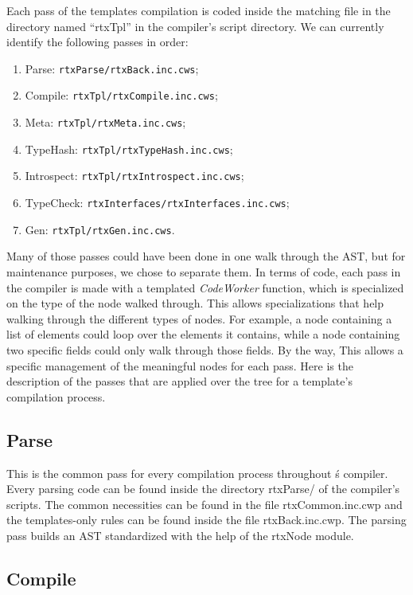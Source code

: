 \documentclass[american]{rtxreport}
\begin{document}
Each pass of the templates compilation is coded inside the matching file in the
directory named ``rtxTpl'' in the compiler's script directory. We can currently
identify the following passes in order:
\begin{enumerate}
    \item Parse: \texttt{rtxParse/rtxBack.inc.cws};
    \item Compile: \texttt{rtxTpl/rtxCompile.inc.cws};
    \item Meta: \texttt{rtxTpl/rtxMeta.inc.cws};
    \item TypeHash: \texttt{rtxTpl/rtxTypeHash.inc.cws};
    \item Introspect: \texttt{rtxTpl/rtxIntrospect.inc.cws};
    \item TypeCheck: \texttt{rtxInterfaces/rtxInterfaces.inc.cws};
    \item Gen: \texttt{rtxTpl/rtxGen.inc.cws}.
\end{enumerate}

Many of those passes could have been done in one walk through the AST, but for
maintenance purposes, we chose to separate them. In terms of code, each pass in
the compiler is made with a templated \emph{CodeWorker} function, which is
specialized on the type of the node walked through. This allows specializations
that help walking through the different types of nodes. For example, a node
containing a list of elements could loop over the elements it contains, while a
node containing two specific fields could only walk through those fields. By
the way, This allows a specific management of the meaningful nodes for each
pass. Here is the description of the passes that are applied over the tree for
a template's compilation process.

\subsection{Parse}

This is the common pass for every compilation process throughout \rtx\'s
compiler. Every parsing code can be found inside the directory rtxParse/ of the
compiler's scripts. The common necessities can be found in the file
rtxCommon.inc.cwp and the templates-only rules can be found inside the file
rtxBack.inc.cwp. The parsing pass builds an AST standardized with the help of
the rtxNode module.

\subsection{Compile}
\end{document}
